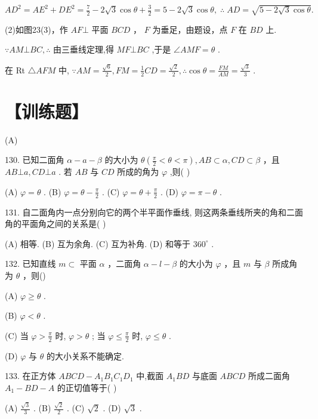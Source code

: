 \documentclass[10pt]{article}
\begin{document}
\(A{D}^{2} = A{E}^{2} + D{E}^{2} = \frac{7}{2} - 2\sqrt{3}\cos \theta  + \frac{3}{2} = 5 - 2\sqrt{3}\cos \theta ,\;\therefore \;{AD} = \sqrt{5 - 2\sqrt{3}\cos \theta }.\)

(2)如图23(3)，作 \({AF} \bot\) 平面 \({BCD}\) ， \(F\) 为垂足，由题设，点 \(F\) 在 \({BD}\) 上.

\(\because {AM} \bot  {BC},\therefore\) 由三垂线定理,得 \({MF} \bot  {BC}\) ,于是 \(\angle {AMF} = \theta\) .

在 Rt \(\bigtriangleup {AFM}\) 中, \(\because {AM} = \frac{\sqrt{6}}{2},{FM} = \frac{1}{2}{CD} = \frac{\sqrt{2}}{2},\therefore \cos \theta  = \frac{FM}{AM} = \frac{\sqrt{3}}{3}\) .

\section*{【训练题】}

(A)

130. 已知二面角 \(\alpha  - a - \beta\) 的大小为 \(\theta \left( {\frac{\pi }{2} < \theta  < \pi }\right) ,{AB} \subset  \alpha ,{CD} \subset  \beta\) ，且 \({AB}\bot a,{CD}\bot a\) . 若 \({AB}\) 与 \({CD}\) 所成的角为 \(\varphi\) ,则(   )

(A) \(\varphi  = \theta\) . (B) \(\varphi  = \theta  - \frac{\pi }{2}\) . (C) \(\varphi  = \theta  + \frac{\pi }{2}\) . (D) \(\varphi  = \pi  - \theta\) .

131. 自二面角内一点分别向它的两个半平面作垂线, 则这两条垂线所夹的角和二面角的平面角之间的关系是( )

(A) 相等. (B) 互为余角. (C) 互为补角. (D) 和等于 \({360}^{ \circ  }\) .

132. 已知直线 \(m \subset\) 平面 \(\alpha\) ，二面角 \(\alpha  - l - \beta\) 的大小为 \(\varphi\) ，且 \(m\) 与 \(\beta\) 所成角为 \(\theta\) ，则()

(A) \(\varphi  \geq  \theta\) .

(B) \(\varphi  < \theta\) .

(C) 当 \(\varphi  > \frac{\pi }{2}\) 时, \(\varphi  > \theta\) ; 当 \(\varphi  \leq  \frac{\pi }{2}\) 时, \(\varphi  \leq  \theta\) .

(D) \(\varphi\) 与 \(\theta\) 的大小关系不能确定.

133. 在正方体 \({ABCD} - {A}_{1}{B}_{1}{C}_{1}{D}_{1}\) 中,截面 \({A}_{1}{BD}\) 与底面 \({ABCD}\) 所成二面角 \({A}_{1} - {BD} - A\) 的正切值等于( )

(A) \(\frac{\sqrt{3}}{3}\) . (B) \(\frac{\sqrt{2}}{2}\) . (C) \(\sqrt{2}\) . (D) \(\sqrt{3}\) .
\end{document}
